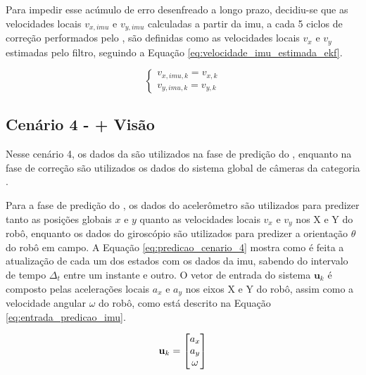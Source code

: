 \documentclass[acronym, symbols, table, deposito]{fei}
\begin{document}
			Para impedir esse acúmulo de erro desenfreado a longo prazo, decidiu-se que as velocidades locais $v_{x,imu}$ e $v_{y,imu}$ calculadas a partir da \acrshort{imu}, a cada 5 ciclos de correção performados pelo , são definidas como as velocidades locais $v_{x}$ e $v_{y}$ estimadas pelo filtro, seguindo a Equação \eqref{eq:velocidade_imu_estimada_ekf}.
			
			\begin{equation}\label{eq:velocidade_imu_estimada_ekf}
				\begin{cases}
					v_{x,imu,k} = v_{x,k} \\
					v_{y,imu,k} = v_{y,k}
				\end{cases}
			\end{equation}
		
		\subsection{Cenário 4 -  + Visão} \label{sec:implementacao_cenario_4}
		
			Nesse cenário 4, os dados da  são utilizados na fase de predição do , enquanto na fase de correção são utilizados os dados do sistema global de câmeras da categoria .
			
			Para a fase de predição do , os dados do acelerômetro são utilizados para predizer tanto as posições globais $x$ e $y$ quanto as velocidades locais $v_{x}$ e $v_{y}$ nos X e Y do robô, enquanto os dados do giroscópio são utilizados para predizer a orientação $\theta$ do robô em campo. A Equação \eqref{eq:predicao_cenario_4} mostra como é feita a atualização de cada um dos estados com os dados da \acrshort{imu}, sabendo do intervalo de tempo $\Delta_t$ entre um instante e outro. O vetor de entrada do sistema $\textbf{u}_k$ é composto pelas acelerações locais $a_{x}$ e $a_{y}$ nos eixos X e Y do robô, assim como a velocidade angular $\omega$ do robô, como está descrito na Equação \eqref{eq:entrada_predicao_imu}.
			
			\begin{equation}\label{eq:entrada_predicao_imu}
				\text{\textbf{u}}_k =
				\begin{bmatrix}
					a_{x} \\
					a_{y} \\
					\omega
				\end{bmatrix}
			\end{equation}
			
\end{document}
